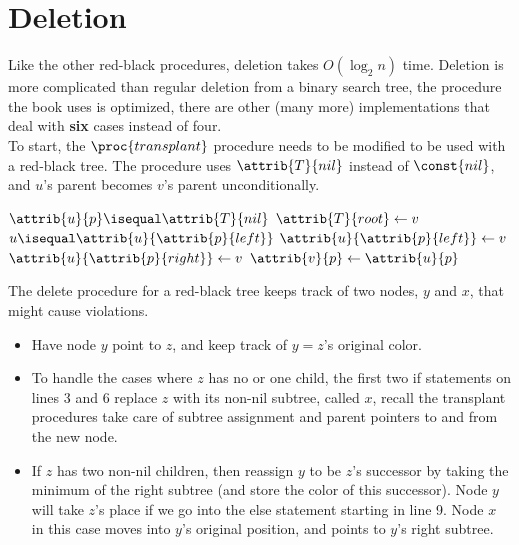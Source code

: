 \documentclass[12pt]{article}
\begin{document}
\newpage

\section*{Deletion}
Like the other red-black procedures, deletion takes $O(\log_2n)$ time. Deletion is more complicated than regular deletion from a binary search tree, the procedure the book uses is optimized, there are other (many more) implementations that deal with \textbf{six} cases instead of four.
\\
To start, the $\proc{transplant}$ procedure needs to be modified to be used with a red-black tree. The procedure uses $\attrib{T}{nil}$ instead of $\const{nil}$, and $u$'s parent becomes $v$'s parent unconditionally.

\begin{codebox}
\li \If $\attrib{u}{p} \isequal \attrib{T}{nil}$
\li \Then
        $\attrib{T}{root} \gets{v}$
\li \ElseIf $u \isequal \attrib{u}{\attrib{p}{left}}$
\li \Then
        $\attrib{u}{\attrib{p}{left}} \gets{v}$
\li \Else
\li     $\attrib{u}{\attrib{p}{right}} \gets{v}$
    \End
\li $\attrib{v}{p} \gets{\attrib{u}{p}}$
\end{codebox}

The delete procedure for a red-black tree keeps track of two nodes, $y$ and $x$, that might cause violations. 

\begin{itemize}
    \item Have node $y$ point to $z$, and keep track of $y = z$'s original color.
    \item To handle the cases where $z$ has no or one child, the first two if statements on lines 3 and 6 replace $z$ with its non-nil subtree, called $x$, recall the transplant procedures take care of subtree assignment and parent pointers to and from the new node.
    \item If $z$ has two non-nil children, then reassign $y$ to be $z$'s successor by taking the minimum of the right subtree (and store the color of this successor). Node $y$ will take $z$'s place if we go into the else statement starting in line 9. Node $x$ in this case moves into $y$'s original position, and points to $y$'s right subtree.
\end{itemize}

\newpage
\end{document}
